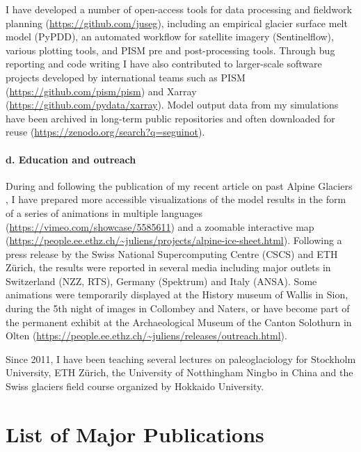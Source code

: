 \documentclass{article}
\begin{document}
    I have developed a number of open-access tools for data processing and
    fieldwork planning (\url{https://github.com/juseg}), including an empirical
    glacier surface melt model (PyPDD), an automated workflow for satellite
    imagery (Sentinelflow), various plotting tools, and PISM pre and
    post-processing tools. Through bug reporting and code writing I have also
    contributed to larger-scale software projects developed by international
    teams such as PISM (\url{https://github.com/pism/pism}) and Xarray
    (\url{https://github.com/pydata/xarray}). Model output data from my
    simulations have been archived in long-term public repositories and often
    downloaded for reuse (\url{https://zenodo.org/search?q=seguinot}).

\paragraph{d. Education and outreach}

    During and following the publication of my recent article on past Alpine
    Glaciers \citep{Seguinot.etal.2018}, I have prepared more accessible
    visualizations of the model results in the form of a series of animations
    in multiple languages (\url{https://vimeo.com/showcase/5585611}) and a
    zoomable interactive map
    (\url{https://people.ee.ethz.ch/~juliens/projects/alpine-ice-sheet.html}).
    Following a press release by the Swiss National Supercomputing Centre
    (CSCS) and ETH Zürich, the results were reported in several media including
    major outlets in Switzerland (NZZ, RTS), Germany (Spektrum) and Italy
    (ANSA). Some animations were temporarily displayed at the History museum of
    Wallis in Sion, during the 5th night of images in Collombey and Naters, or
    have become part of the permanent exhibit at the Archaeological Museum of
    the Canton Solothurn in Olten
    (\url{https://people.ee.ethz.ch/~juliens/releases/outreach.html}).

    Since 2011, I have been teaching several lectures on paleoglaciology for
    Stockholm University, ETH Zürich, the University of Notthingham Ningbo in
    China and the Swiss glaciers field course organized by Hokkaido University.


\section{List of Major Publications}
\end{document}
